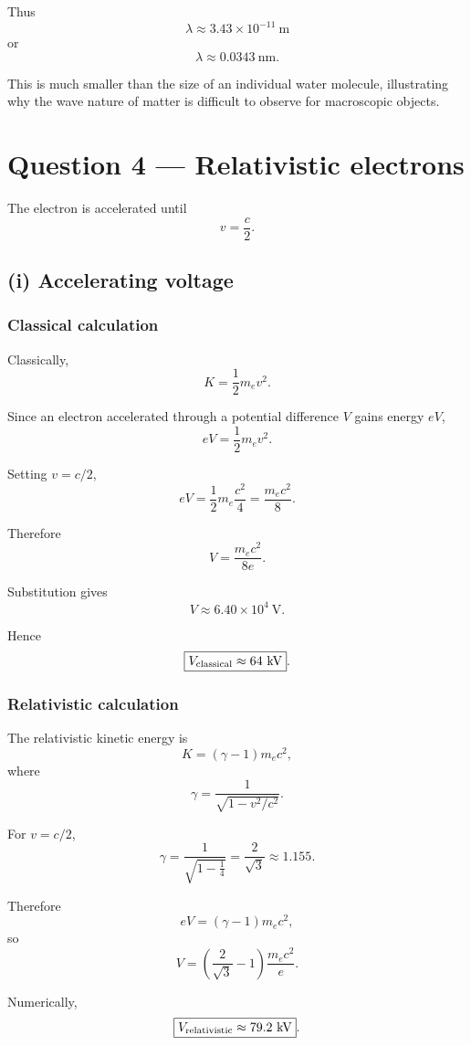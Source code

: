 \documentclass[11pt,a4paper]{article}
\begin{document}
Thus
\[
\boxed{\lambda\approx3.43\times10^{-11}\ \mathrm m}
\]
or
\[
\boxed{\lambda\approx0.0343\ \mathrm{nm}}.
\]

This is much smaller than the size of an individual water molecule, illustrating why
the wave nature of matter is difficult to observe for macroscopic objects.

\section{Question 4 --- Relativistic electrons}

The electron is accelerated until
\[
v=\frac c2.
\]

\subsection{(i) Accelerating voltage}

\subsubsection*{Classical calculation}

Classically,
\[
K=\frac12m_ev^2.
\]

Since an electron accelerated through a potential difference $V$ gains energy $eV$,
\[
eV=\frac12m_ev^2.
\]

Setting $v=c/2$,
\[
eV
=
\frac12m_e\frac{c^2}{4}
=
\frac{m_ec^2}{8}.
\]

Therefore
\[
V=\frac{m_ec^2}{8e}.
\]

Substitution gives
\[
V
\approx6.40\times10^4\ \mathrm V.
\]

Hence
\[
\boxed{V_{\rm classical}\approx64\ \mathrm{kV}}.
\]

\subsubsection*{Relativistic calculation}

The relativistic kinetic energy is
\[
K=(\gamma-1)m_ec^2,
\]
where
\[
\gamma=
\frac{1}{\sqrt{1-v^2/c^2}}.
\]

For $v=c/2$,
\[
\gamma
=
\frac{1}{\sqrt{1-\frac14}}
=
\frac{2}{\sqrt3}
\approx1.155.
\]

Therefore
\[
eV=(\gamma-1)m_ec^2,
\]
so
\[
V
=
\left(\frac{2}{\sqrt3}-1\right)
\frac{m_ec^2}{e}.
\]

Numerically,
\[
\boxed{V_{\rm relativistic}\approx79.2\ \mathrm{kV}}.
\]
\end{document}
